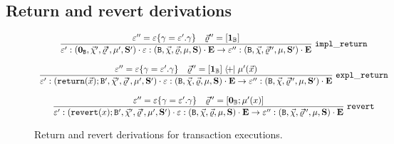 \subsection{Return and revert derivations} 

\begin{figure}[ht]
$$
\begin{array}{c}
\dfrac{\varepsilon''=\varepsilon\{\gamma = \varepsilon'.\gamma\}\quad \vec{\varrho}''=[\mathbf{1}_{\mathbb{B}}]}
{
\varepsilon':(\mathbf{0}_{\mathtt{B}}, \vec{\chi}', \vec{\varrho}', \mu', \mathbf{S}')\cdot\varepsilon:(\mathtt{B},\vec{\chi},\vec{\varrho},\mu,\mathbf{S})\cdot\mathbf{E} \to \varepsilon'':
(\mathtt{B},\vec{\chi},\vec{\varrho}'',\mu,\mathbf{S}')\cdot\mathbf{E}}\;\mathtt{impl\_return} 
\\\\
\dfrac{\varepsilon''=\varepsilon\{\gamma = \varepsilon'.\gamma\}\quad \vec{\varrho}''=[\mathbf{1}_{\mathbb{B}}]\mathrel{\bf\langle\!+\!\!\mid}\mu'(\vec x)}
{
\varepsilon':(\mathtt{return}(\vec x);\mathtt{B}', \vec{\chi}', \vec{\varrho}', \mu', \mathbf{S}')\cdot\varepsilon:(\mathtt{B},\vec{\chi},\vec{\varrho},\mu,\mathbf{S})\cdot\mathbf{E} \to
\varepsilon'':(\mathtt{B},\vec{\chi},\vec{\varrho}'',\mu,\mathbf{S}')\cdot\mathbf{E}}\;\mathtt{expl\_return} 
\\\\
\dfrac{\varepsilon''=\varepsilon\{\gamma = \varepsilon'.\gamma\}\quad \vec{\varrho}''=[\mathbf{0}_{\mathbb{B}};\mu'(x)]}
{
\varepsilon':(\mathtt{revert}(x);\mathtt{B}', \vec{\chi}', \vec{\varrho}', \mu', \mathbf{S}')\cdot\varepsilon:(\mathtt{B},\vec{\chi},\vec{\varrho},\mu,\mathbf{S}) \cdot\mathbf{E} 
\to 
\varepsilon'':(\mathtt{B},\vec{\chi},\vec{\varrho}'',\mu,\mathbf{S})  \cdot\mathbf{E}}\;\mathtt{revert}
\end{array}
$$
\caption{Return and revert derivations for transaction executions.}
\end{figure}
